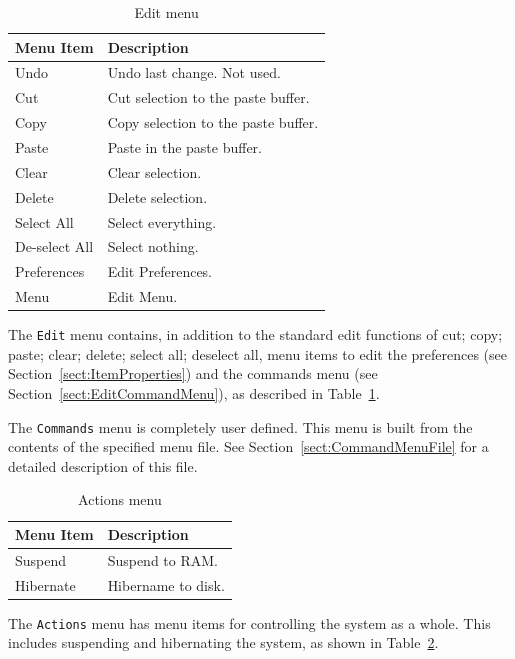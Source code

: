 \begin{table}[hbpt]
\begin{centering}
\begin{tabular}{|l|p{3in}|}
\hline
Menu Item & Description \\
\hline
\hline
Undo & Undo last change.  Not used. \\
\hline
Cut & Cut selection to the paste buffer. \\
\hline
Copy & Copy selection to the paste buffer. \\
\hline
Paste & Paste in the paste buffer. \\
\hline
Clear & Clear selection. \\
\hline
Delete & Delete selection. \\
\hline
Select All & Select everything. \\
\hline
De-select All & Select nothing. \\
\hline
Preferences & Edit Preferences. \\
\hline
Menu & Edit Menu. \\
\hline
\end{tabular}
\caption{Edit menu}
\label{ref:tab:editmenu}
\end{centering}
\end{table}
The \texttt{Edit} menu contains, in addition to the standard edit
functions of cut; copy; paste; clear; delete; select all; deselect all,
menu items to edit the preferences (see
Section~\ref{sect:ItemProperties}) and the commands menu (see
Section~\ref{sect:EditCommandMenu}), as described in Table~\ref{ref:tab:editmenu}.

The \texttt{Commands} menu is completely user defined.  This menu is
built from the contents of the specified menu file.  See
Section~\ref{sect:CommandMenuFile} for a detailed description of this
file.

\begin{table}[hbpt]
\begin{centering}
\begin{tabular}{|l|p{3in}|}
\hline
Menu Item & Description \\   
\hline
\hline
Suspend & Suspend to RAM. \\
\hline
Hibernate & Hibername to disk. \\
\hline
\end{tabular}
\caption{Actions menu}
\label{ref:tab:actionsmenu}
\end{centering}
\end{table}
The \texttt{Actions} menu has menu items for controlling the system as a
whole. This includes suspending and hibernating the system, as shown in
Table~\ref{ref:tab:actionsmenu}. 

